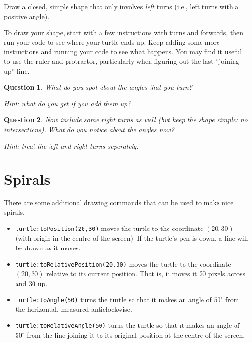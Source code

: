 \documentclass[
  xhtml,%
  use filename%
]{internet}
\newtheorem{question}{Question}
\begin{document}
Draw a closed, simple shape that only involves \emph{left} turns (i.e., left turns with a positive angle).

To draw your shape, start with a few instructions with turns and forwards, then run your code to see where your turtle ends up.
Keep adding some more instructions and running your code to see what happens.
You may find it useful to use the ruler and protractor, particularly when figuring out the last ``joining up'' line.

\begin{question}
What do you spot about the angles that you turn?

\end{question}

\emph{Hint: what do you get if you add them up?}

\begin{question}
Now include some right turns as well (but keep the shape simple: no intersections).
What do you notice about the angles now?
\end{question}

\emph{Hint: treat the left and right turns separately.}

\section{Spirals}

There are some additional drawing commands that can be used to make nice spirals.

\begin{itemize}
\item \verb+turtle:toPosition(20,30)+ moves the turtle to the coordinate \((20,30)\) (with origin in the centre of the screen).
If the turtle's pen is down, a line will be drawn as it moves.

\item \verb+turtle:toRelativePosition(20,30)+ moves the turtle to the
coordinate \((20,30)\) relative to its current position.
That is, it moves it \(20\) pixels across and \(30\) up.

\item \verb+turtle:toAngle(50)+ turns the turtle so that it makes an angle of \(50^\circ\) from the horizontal, measured anticlockwise.

\item \verb+turtle:toRelativeAngle(50)+ turns the turtle so that it makes an angle of \(50^\circ\) from the line joining it to its original position at the centre of the screen.
\end{itemize}
\end{document}
